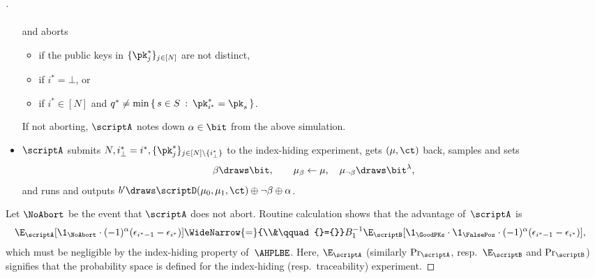 \begin{proof}[]
\begin{itemize}
\begin{align*}
\end{align*}
and aborts
\begin{itemize}
\item if the public keys in $\{\pk^\ast_j\}_{j\in[N]}$ are not distinct,
\item if $i^\ast=\bot$, or
\item if ${i^\ast\in[N]}$ and ${q^\ast\neq\min{\{\,s\in S\::\:\pk^\ast_{i^\ast}=\pk_s\,\}}}$.
\end{itemize}
If not aborting,
$\scriptA$ notes down ${\alpha\in\bit}$ from the above simulation.
\item
$\scriptA$ submits $N,{i_\bot^\ast=i^\ast},\{\pk^\ast_j\}_{j\in[N]\setminus\{i_\bot^\ast\}}$ to the index-hiding experiment,
gets $(\mu,\ct)$ back,
samples and sets
\begin{align*}
\beta\draws\bit,\qquad
\mu_\beta\gets\mu,\quad
\mu_{\neg\beta}\draws\bit^\lambda,
\end{align*}
and runs and outputs
${b'\draws\scriptD(\mu_0,\mu_1,\ct)\oplus\neg\beta\oplus\alpha}$.
\end{itemize}
Let $\NoAbort$ be the event that $\scriptA$ does not abort.
Routine calculation shows that the advantage of~$\scriptA$ is
\begin{align*}
&
\E_\scriptA[\1_\NoAbort\cdot(-1)^\alpha(\epsilon_{i^\ast-1}-\epsilon_{i^\ast})]
\WideNarrow{=}{\\&\qquad{}={}}
B_1^{-1}\E_\scriptB[\1_\GoodPKs\cdot\1_\FalsePos\cdot(-1)^\alpha(\epsilon_{i^\ast-1}-\epsilon_{i^\ast})],
\end{align*}
which must be negligible by the index-hiding property of~$\AHPLBE$.
Here, $\E_\scriptA$ (similarly $\Pr_\scriptA$, resp.~$\E_\scriptB$ and $\Pr_\scriptB$) signifies that the probability space is defined for the index-hiding (resp.~traceability) experiment.


\end{proof}
